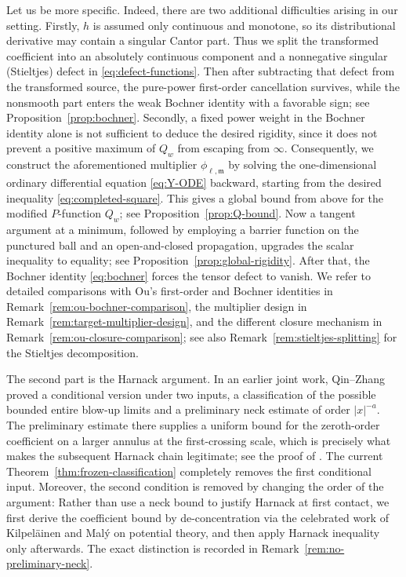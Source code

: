 \documentclass[reqno,12pt]{amsart}
\numberwithin{equation}{section}
\theoremstyle{remark}
\begin{document}
Let us be more specific. Indeed, there are two additional difficulties arising in our setting.  Firstly, $h$ is assumed only continuous and monotone, so its distributional derivative may contain a singular Cantor
part.  Thus we split the transformed coefficient into an absolutely continuous component and a nonnegative singular (Stieltjes) defect in \eqref{eq:defect-functions}.  Then after subtracting that defect from the transformed source, the pure-power first-order cancellation survives,
while the nonsmooth part enters the weak Bochner identity with a favorable sign; see Proposition~\ref{prop:bochner}. Secondly, a fixed power weight in the Bochner identity alone is not sufficient to deduce the desired rigidity, since it does not prevent a positive maximum of $Q_w$ from escaping from $\infty$. 
Consequently, we construct the aforementioned multiplier $\phi_{\ell,\mathfrak m}$ by solving the one-dimensional ordinary differential equation \eqref{eq:Y-ODE} backward, starting from the desired inequality \eqref{eq:completed-square}.
This gives a global bound from above for the modified $P$-function $Q_w$; see Proposition~\ref{prop:Q-bound}.  Now a tangent argument at a minimum, followed by employing a  barrier function on the punctured ball and an open-and-closed propagation, upgrades the scalar inequality to equality; see Proposition~\ref{prop:global-rigidity}. After that, the Bochner identity \eqref{eq:bochner} 
forces the tensor defect to vanish.  We refer to detailed comparisons with Ou's first-order and Bochner identities in Remark~\ref{rem:ou-bochner-comparison}, the multiplier design in Remark~\ref{rem:target-multiplier-design}, and the different closure mechanism in Remark~\ref{rem:ou-closure-comparison}; see also Remark~\ref{rem:stieltjes-splitting} for the Stieltjes decomposition.

The second part is the Harnack argument.  In an earlier joint work, Qin--Zhang \cite{QZ2026} proved a conditional
version under two inputs, a classification of the possible bounded entire blow-up limits and a preliminary neck estimate of order $|x|^{-a}$.  The preliminary estimate there supplies a uniform bound for the zeroth-order coefficient on a larger annulus at the first-crossing scale, which is precisely what makes the subsequent Harnack chain legitimate; see the proof of \cite[Lemma~3.7]{QZ2026}.
The current Theorem~\ref{thm:frozen-classification} completely removes the first conditional input.
Moreover, the second condition is removed by changing the order of the argument: Rather than use a neck bound to justify Harnack at first contact, we first derive the coefficient 
bound by  de-concentration via the celebrated work of Kilpel\"ainen and Mal\'y \cite{KM1994} on potential theory, and then apply Harnack inequality only afterwards. 
The exact distinction is recorded in Remark~\ref{rem:no-preliminary-neck}.
\end{document}
